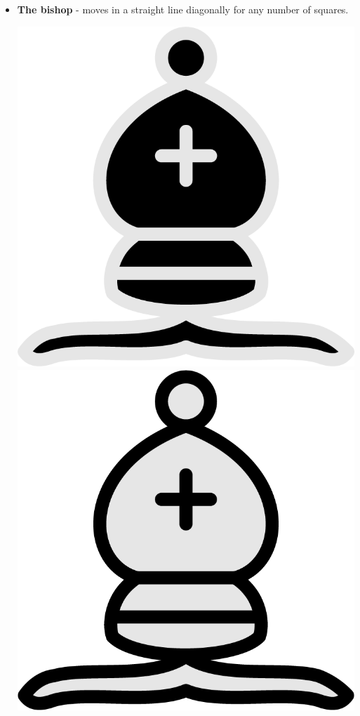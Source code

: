 \documentclass{article}
\begin{document}
\begin{itemize}
\begin{center}
    \end{center}
    
    \item \textbf{The bishop} - moves in a straight line diagonally for any number of squares.\\
    \begin{center}
    	\includegraphics[scale=0.1]{image1.png}
    	\includegraphics[scale=0.1]{image16.png}
    \end{center}
    

\end{itemize}
\end{document}
